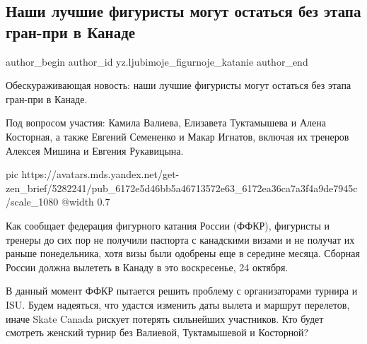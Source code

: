  
 
 
 
 
 
\subsection{Наши лучшие фигуристы могут остаться без этапа гран-при в Канаде}
\label{sec:22_10_2021.sites.ru.zen_yandex.yz.ljubimoje_figurnoje_katanie.1.figuristy_kanada_granpri}
 
\ifcmt
 author_begin
   author_id yz.ljubimoje_figurnoje_katanie
 author_end
\fi

Обескураживающая новость: наши лучшие фигуристы могут остаться без этапа
гран-при в Канаде.

Под вопросом участия: Камила Валиева, Елизавета Туктамышева и Алена Косторная,
а также Евгений Семененко и Макар Игнатов, включая их тренеров Алексея Мишина и
Евгения Рукавицына.

\ifcmt
  pic https://avatars.mds.yandex.net/get-zen_brief/5282241/pub_6172e5d46bb5a46713572e63_6172ea36ca7a3f4a9de7945c/scale_1080
  @width 0.7
\fi

Как сообщает федерация фигурного катания России (ФФКР), фигуристы и тренеры до
сих пор не получили паспорта с канадскими визами и не получат их раньше
понедельника, хотя визы были одобрены еще в середине месяца. Сборная России
должна вылететь в Канаду в это воскресенье, 24 октября.

В данный момент ФФКР пытается решить проблему с организаторами турнира и ISU.
Будем надеяться, что удастся изменить даты вылета и маршрут перелетов, иначе
Skate Canada рискует потерять сильнейших участников. Кто будет смотреть женский
турнир без Валиевой, Туктамышевой и Косторной?
